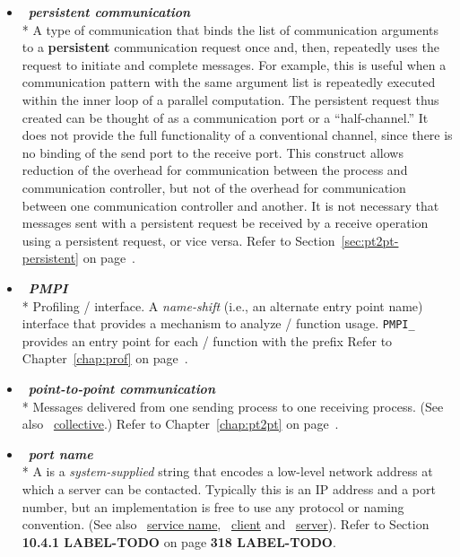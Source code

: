 \begin{itemize}
\label{glossary:persistent_communication}
\item  ~\hypertarget{glossary:persistent_communication}{\emph{\textbf{persistent communication}}} \\*
A type of communication that binds the list of communication arguments to a {\bf persistent} communication
request once and, then, repeatedly uses
the request to initiate and complete messages.
For example, this is useful when
a communication pattern with the same argument list is repeatedly
executed within the inner loop of a parallel computation.   The
persistent request thus created can be thought of as a
communication port or a ``half-channel.''
It does not provide the full functionality of a conventional channel,
since there is no binding of the send port to the receive port. This
construct allows reduction of the overhead for communication
between the process and communication controller, but not of the overhead for
communication between one communication controller and another.
It is not necessary that messages sent with a persistent request be received
by a receive operation using a persistent request, or vice versa.
Refer to Section~\ref{sec:pt2pt-persistent} on page~\pageref{sec:pt2pt-persistent}.

\label{glossary:PMPI}
\item  ~\hypertarget{glossary:PMPI}{\emph{\textbf{PMPI}}} \\*
Profiling \MPI/ interface. A \emph{name-shift} (i.e., an alternate entry point name)
 interface that provides a mechanism to analyze \MPI/ function usage.
{\tt PMPI\_} provides an entry point for each \MPI/ function with the prefix  
Refer to Chapter~\ref{chap:prof} on page~\pageref{chap:prof}.

\label{glossary:point-to-point communication}
\item  ~\hypertarget{glossary:point-to-point_communication}{\emph{\textbf{point-to-point communication}}} \\*
Messages delivered from one sending process to one receiving process. (See also ~\hyperlink{glossary:collective}{collective}.)
Refer to Chapter~\ref{chap:pt2pt} on page~\pageref{chap:pt2pt}.

\label{glossary:port_name}
\item  ~\hypertarget{glossary:port_name}{\emph{\textbf{port name}}} \\*
A  is a {\em system-supplied} string that encodes a
low-level network address at which a server can be
contacted. Typically this is an IP address and a port number, but an
implementation is free to use any protocol or naming convention.
(See also ~\hyperlink{glossary:service_name}{service name},
~\hyperlink{glossary:client}{client} and ~\hyperlink{glossary:server}{server}). 
Refer to Section {\bf 10.4.1 LABEL-TODO} on page {\bf 318 LABEL-TODO}.


\end{itemize}
